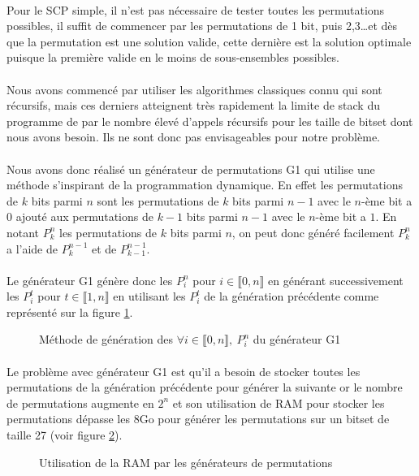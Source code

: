 \documentclass[12pt,letterpaper,twoside]{article}
\begin{document}
			\paragraph*{}
				Pour le SCP simple, il n'est pas nécessaire de tester toutes les permutations possibles, il suffit de commencer par les permutations de 1 bit, puis 2,3\ldots et dès que la permutation est une solution valide, cette dernière est la solution optimale puisque la première valide en le moins de sous-ensembles possibles.
			\paragraph*{}
				Nous avons commencé par utiliser les algorithmes classiques connu qui sont récursifs, mais ces derniers atteignent très rapidement la limite de stack du programme de par le nombre élevé d'appels récursifs pour les taille de bitset dont nous avons besoin. Ils ne sont donc pas envisageables pour notre problème.
			\paragraph*{}
				Nous avons donc réalisé un générateur de permutations G1 qui utilise une méthode s'inspirant de la programmation dynamique. En effet les permutations de \(k\) bits parmi \(n\) sont les permutations de \(k\) bits parmi \(n-1\) avec le \(n\)-ème bit a \(0\) ajouté aux permutations de \(k-1\) bits parmi \(n-1\) avec le \(n\)-ème bit a \(1\). En notant \(P_k^n\) les permutations de \(k\) bits parmi \(n\), on peut donc généré facilement \(P_k^n\) a l'aide de \(P_k^{n-1}\) et de \(P_{k-1}^{n-1}\).
			\paragraph*{}
				Le générateur G1 génère donc les \(P_i^n\) pour \(i \in \llbracket 0, n \rrbracket\) en générant successivement les \(P_i^t\) pour \(t\in \llbracket 1, n \rrbracket\) en utilisant les \(P_i^t\) de la génération précédente comme représenté sur la figure \ref{fig:g1_permutations}.
			\begin{figure}[H]
				\centering%
				\resizebox{0.4\textwidth}{!}{}%
				\caption{Méthode de génération des \(\forall i \in \llbracket 0, n \rrbracket,\ P_i^n\) du générateur G1}%
				\label{fig:g1_permutations}%
			\end{figure}
			\paragraph*{}
				Le problème avec générateur G1 est qu'il a besoin de stocker toutes les permutations de la génération précédente pour générer la suivante or le nombre de permutations augmente en \(2^n\) et son utilisation de RAM pour stocker les permutations dépasse les 8Go pour générer les permutations sur un bitset de taille 27 (voir figure \ref{figure:permutations_generators_ram}).
			\begin{figure}[H]
				\centering
				\caption{Utilisation de la RAM par les générateurs de permutations}
				\label{figure:permutations_generators_ram}
			\end{figure}
\end{document}
